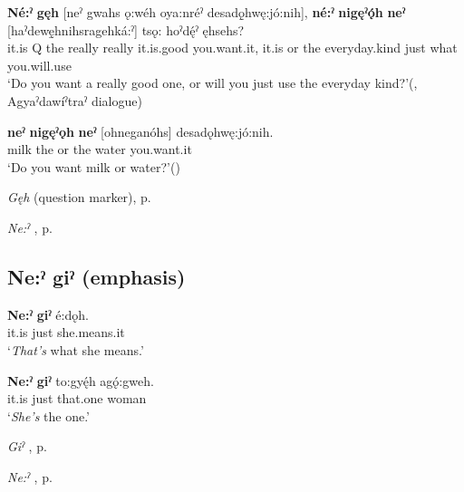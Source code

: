 \ea
\label{ex:npar49}
\gll \textbf{Né:ˀ} \textbf{gęh} [neˀ gwahs ǫ:wéh oya:nréˀ desadǫ̱hwę:jó:nih], \textbf{né:ˀ} \textbf{nigęˀǫ́h} \textbf{neˀ} [haˀdewę̱hnihsragehká:ˀ] tsǫ: hoˀdę́ˀ ęhsehs?\\
it.is Q the really really it.is.good you.want.it, it.is or the everyday.kind just what you.will.use\\
\glt ‘Do you want a really good one, or will you just use the everyday kind?’(\cite[225]{mithun_watewayestanih_1984}, Agyaˀdawíˀtraˀ dialogue)
\z

\ea
\label{ex:npar50}
\gll [Onǫˀgwáˀ] \textbf{neˀ} \textbf{nigęˀǫh} \textbf{neˀ} [ohneganóhs] desadǫhwę:jó:nih.\\
milk the or the water you.want.it\\
\glt ‘Do you want milk or water?’(\cite[45]{michelson_ontario_2011})
\z

\begin{CayugaRelated}
\item \textit{Gęh}  (question marker), p. \pageref{p:[gęh] `Q’}\\
\item \textit{Ne:ˀ} , p. \pageref{p:[ne:ˀ] `it is’}
\end{CayugaRelated}

\subsection*{\textbf{Ne:ˀ giˀ}  (emphasis)} \label{p:[ne:ˀ giˀ]}

\ea
\label{ex:npar51}
\gll \textbf{Ne:ˀ} \textbf{giˀ} é:dǫh.\\
it.is just she.means.it\\
\glt ‘\emph{That’s} what she means.’
\z

\ea
\label{ex:npar52}
\gll \textbf{Ne:ˀ} \textbf{giˀ} to:gyę́h agǫ́:gweh.\\
it.is just that.one woman\\
\glt ‘\emph{She’s} the one.’
\z

\begin{CayugaRelated}
\item \textit{Giˀ} , p. \pageref{p:[giˀ]}\\
\item \textit{Ne:ˀ} , p. \pageref{p:[ne:ˀ] `it is’}
\end{CayugaRelated}

